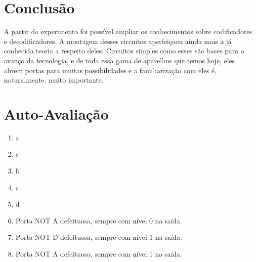 \documentclass[12pt]{article}
\begin{document}
\section{Conclusão}
\label{sec:Conclusao}

A partir do experimento foi possível ampliar os conhecimentos sobre codificadores e decodificadores. A montagem desses circuitos aperfeiçoou ainda mais a já conhecida teoria a respeito deles. Circuitos simples como esses são bases para o avanço da tecnologia, e de toda essa gama de aparelhos que temos hoje, eles abrem portas para muitas possibilidades e a familiarização com eles é, naturalmente, muito importante.






\newpage 
\section*{Auto-Avaliação}

\begin{enumerate}
    \item a
    \item c
    \item b
    \item c
    \item d
    \item Porta NOT A defeituosa, sempre com nível 0 na saída.
    \item Porta NOT D defeituosa, sempre com nível 1 na saída. 
    \item Porta NOT A defeituosa, sempre com nível 1 na saída.
\end{enumerate}
\end{document}

